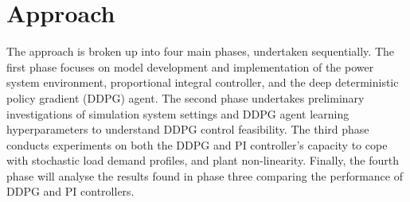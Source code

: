 \chapter{Approach}
The approach is broken up into four main phases, undertaken sequentially. The first phase focuses on model development and implementation of the power system environment, proportional integral controller, and the deep deterministic policy gradient (DDPG) agent. The second phase undertakes preliminary investigations of simulation system settings and DDPG agent learning hyperparameters to understand DDPG control feasibility. The third phase conducts experiments on both the DDPG and PI controller's capacity to cope with stochastic load demand profiles, and plant non-linearity. Finally, the fourth phase will analyse the results found in phase three comparing the performance of DDPG and PI controllers.












